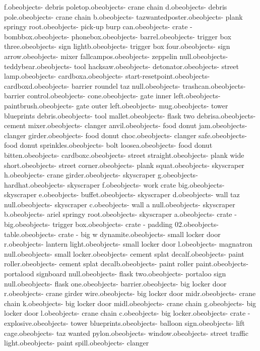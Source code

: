 f.obe objects\bank - debris poletop.obe objects\bank - crane chain d.obe objects\bank - debris pole.obe objects\bank - crane chain b.obe objects\bank - tazwantedposter.obe objects\bank - plank springy root.obe objects\bank - pick-up burp can.obe objects\bank - crate - bombbox.obe objects\bank - phonebox.obe objects\bank - barrel.obe objects\bank - trigger box three.obe objects\bank - sign lightb.obe objects\bank - trigger box four.obe objects\bank - sign arrow.obe objects\bank - mixer fallcampos.obe objects\bank - zeppelin null.obe objects\bank - teddybear.obe objects\bank - tool hacksaw.obe objects\bank - detonator.obe objects\bank - street lamp.obe objects\bank - cardboxa.obe objects\bank - start-resetpoint.obe objects\bank - cardboxd.obe objects\bank - barrier roundel taz null.obe objects\bank - trashcan.obe objects\bank - barrier control.obe objects\bank - cone.obe objects\bank - gate inner left.obe objects\bank - paintbrush.obe objects\bank - gate outer left.obe objects\bank - mug.obe objects\bank - tower blueprints debris.obe objects\bank - tool mallet.obe objects\bank - flask two debrisa.obe objects\bank - cement mixer.obe objects\bank - clanger anvil.obe objects\bank - food donut jam.obe objects\bank - clanger girder.obe objects\bank - food donut choc.obe objects\bank - clanger safe.obe objects\bank - food donut sprinkles.obe objects\bank - bolt loosea.obe objects\bank - food donut bitten.obe objects\bank - cardboxc.obe objects\bank - street straight.obe objects\bank - plank wide short.obe objects\bank - street corner.obe objects\bank - plank squat.obe objects\bank - skyscraper h.obe objects\bank - crane girder.obe objects\bank - skyscraper g.obe objects\bank - hardhat.obe objects\bank - skyscraper f.obe objects\bank - work crate big.obe objects\bank - skyscraper e.obe objects\bank - buffet.obe objects\bank - skyscraper d.obe objects\bank - wall taz null.obe objects\bank - skyscraper c.obe objects\bank - wall a null.obe objects\bank - skyscraper b.obe objects\bank - ariel springy root.obe objects\bank - skyscraper a.obe objects\bank - crate - big.obe objects\bank - trigger box.obe objects\bank - crate - padding 02.obe objects\bank - table.obe objects\bank - crate - big w dynamite.obe objects\bank - small locker door r.obe objects\bank - lantern light.obe objects\bank - small locker door l.obe objects\bank - magnatron null.obe objects\bank - small locker.obe objects\bank - cement splat decalf.obe objects\bank - paint roller.obe objects\bank - cement splat decalb.obe objects\bank - paint roller paint.obe objects\bank - portalood signboard null.obe objects\bank - flask two.obe objects\bank - portaloo sign null.obe objects\bank - flask one.obe objects\bank - barrier.obe objects\bank - big locker door r.obe objects\bank - crane girder wire.obe objects\bank - big locker door midr.obe objects\bank - crane chain k.obe objects\bank - big locker door midl.obe objects\bank - crane chain g.obe objects\bank - big locker door l.obe objects\bank - crane chain c.obe objects\bank - big locker.obe objects\bank - crate - explosive.obe objects\bank - tower blueprints.obe objects\bank - balloon sign.obe objects\bank - lift cage.obe objects\bank - taz wanted pylon.obe objects\bank - window.obe objects\bank - street traffic light.obe objects\bank - paint spill.obe objects\bank - clanger 